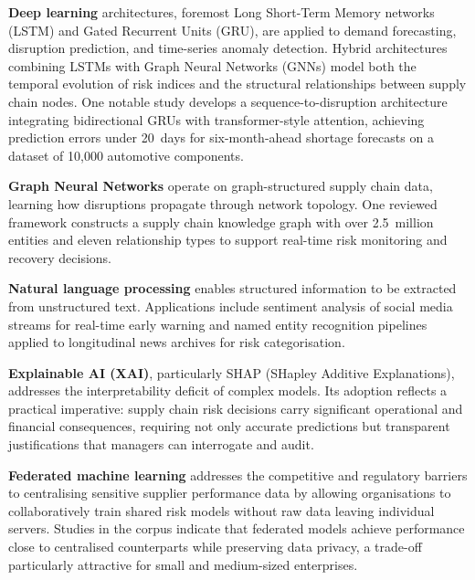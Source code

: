 \textbf{Deep learning} architectures, foremost Long Short-Term Memory
networks (LSTM) and Gated Recurrent Units (GRU), are applied to demand
forecasting, disruption prediction, and time-series anomaly detection.
Hybrid architectures combining LSTMs with Graph Neural Networks (GNNs)
model both the temporal evolution of risk indices and the structural
relationships between supply chain nodes. One notable study develops a
sequence-to-disruption architecture integrating bidirectional GRUs with
transformer-style attention, achieving prediction errors under 20~days for
six-month-ahead shortage forecasts on a dataset of 10,000 automotive
components.
 
\textbf{Graph Neural Networks} operate on graph-structured supply chain
data, learning how disruptions propagate through network topology. One
reviewed framework constructs a supply chain knowledge graph with over
2.5~million entities and eleven relationship types to support real-time risk
monitoring and recovery decisions.
 
\textbf{Natural language processing} enables structured information to be
extracted from unstructured text. Applications include sentiment analysis of
social media streams for real-time early warning and named entity recognition
pipelines applied to longitudinal news archives for risk categorisation.
 
\textbf{Explainable AI (XAI)}, particularly SHAP (SHapley Additive
Explanations), addresses the interpretability deficit of complex models. Its
adoption reflects a practical imperative: supply chain risk decisions carry
significant operational and financial consequences, requiring not only
accurate predictions but transparent justifications that managers can
interrogate and audit.
 
\textbf{Federated machine learning} addresses the competitive and regulatory
barriers to centralising sensitive supplier performance data by allowing
organisations to collaboratively train shared risk models without raw data
leaving individual servers. Studies in the corpus indicate that federated
models achieve performance close to centralised counterparts while preserving
data privacy, a trade-off particularly attractive for small and medium-sized
enterprises.